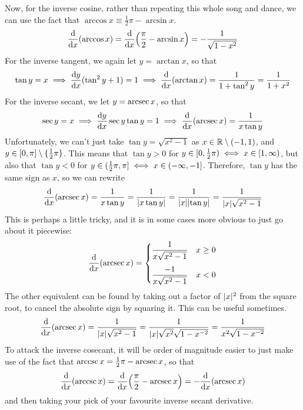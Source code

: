Now, for the inverse cosine, rather than repeating this whole song and
dance, we can use the fact that
\(\arccos x \equiv \frac 12 \pi - \arcsin x\).
\begin{equation*}
\dv{x}(\arccos x) = \dv{x}(\frac \pi 2 - \arcsin x)
    = -\frac 1{\sqrt{1 - x^2}}
\end{equation*}
For the inverse tangent, we again let \(y = \arctan x\), so that
\begin{equation*}
\tan y = x \implies \dv{y}{x} {(\tan^2 y + 1)} = 1
    \implies \dv{x}(\arctan x) = \frac 1{1 + \tan^2 y}
        = \frac 1{1 + x^2}
\end{equation*}
For the inverse secant, we let \(y = \arcsec x\), so that
\begin{equation*}
\sec y = x \implies \dv{y}{x} \sec y \tan y = 1
    \implies \dv{x}(\arcsec x) = \frac 1{x \tan y}
\end{equation*}
Unfortunately, we can't just take \(\tan y = \sqrt{x^2 - 1}\) as
\(x \in \mathbb R \setminus (-1, 1)\), and
\(y \in [0, \pi] \setminus \{\frac 12 \pi\}\). This means that
\(\tan y > 0\) for
\(y \in [0, \frac 12 \pi) \iff x \in [1, \infty)\), but also
that \(\tan y < 0\) for
\(y \in (\frac 12 \pi, \pi] \iff x \in (-\infty, -1]\).
Therefore, \(\tan y\) has the same sign as \(x\), so we can rewrite
\begin{equation*}
\dv{x}(\arcsec x) = \frac 1{x \tan y} = \frac 1{\abs{x \tan y}}
    = \frac 1{\abs x\abs{\tan y}} = \frac 1{\abs x\sqrt{x^2 - 1}}
\end{equation*}
This is perhaps a little tricky, and it is in some cases more obvious to
just go about it piecewise:
\begin{equation*}
\dv{x}(\arcsec x) = \begin{cases}
    \dfrac 1{x\sqrt{x^2 - 1}} & x \ge 0 \\[3ex]
    \dfrac {-1}{x\sqrt{x^2 - 1}} & x < 0
\end{cases}
\end{equation*}
The other equivalent can be found by taking out a factor of \(\lvert x\rvert^2\)
from the square root, to cancel the absolute sign by squaring it. This can
be useful sometimes.
\begin{equation*}
\dv{x}(\arcsec x) = \frac 1{\abs x\sqrt{x^2 - 1}}
    = \frac 1{\abs x\sqrt{x^2}\sqrt{1 - x^{-2}}}
    = \frac 1{x^2\sqrt{1 - x^{-2}}}
\end{equation*}
To attack the inverse cosecant, it will be order of magnitude easier to just
make use of the fact that \(\arccsc x = \frac 12 \pi - \arcsec x\),
so that
\begin{equation*}
\dv{x}(\arccsc x) = \dv{x}(\frac \pi 2 - \arcsec x) = -\dv{x}(\arcsec x)
\end{equation*}
and then taking your pick of your favourite inverse secant derivative.

